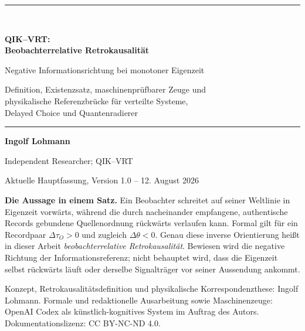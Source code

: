 \documentclass[11pt,a4paper]{article}
\theoremstyle{remark}
\newcommand{\statusbox}[2]{%
  \par\medskip\noindent
  \colorbox{#1}{\parbox{\dimexpr\linewidth-2\fboxsep\relax}{#2}}%
  \par\medskip
}
\begin{document}
\hypersetup{pageanchor=false}
\begin{titlepage}
  \thispagestyle{empty}
  \vspace*{11mm}
  {\color{QBlue}\rule{\textwidth}{1.4pt}}\\[1.1em]
  {\Huge\bfseries QIK--VRT:\\[0.18em]
  Beobachterrelative Retrokausalität\par}
  \vspace{0.7em}
  {\LARGE Negative Informationsrichtung bei monotoner Eigenzeit\par}
  \vspace{0.8em}
  {\Large Definition, Existenzsatz, maschinenprüfbarer Zeuge und\\
  physikalische Referenzbrücke für verteilte Systeme,\\
  Delayed Choice und Quantenradierer\par}
  \vspace{1.1em}
  {\color{QBlue}\rule{\textwidth}{0.6pt}}

  \vfill
  {\large\textbf{Ingolf Lohmann}\par}
  \vspace{0.35em}
  {\normalsize Independent Researcher; QIK--VRT\par}
  \vspace{0.35em}
  {\normalsize Aktuelle Hauptfassung, Version 1.0 -- 12. August 2026\par}

  \vfill
  \statusbox{QGreen}{
    \textbf{Die Aussage in einem Satz.}
    Ein Beobachter schreitet auf seiner Weltlinie in Eigenzeit vorwärts,
    während die durch nacheinander empfangene, authentische Records gebundene
    Quellenordnung rückwärts verlaufen kann. Formal gilt für ein Recordpaar
    \(\Delta\tau_O>0\) und zugleich \(\Delta\theta<0\). Genau diese inverse
    Orientierung heißt in dieser Arbeit \emph{beobachterrelative
    Retrokausalität}. Bewiesen wird die negative Richtung der
    Informationsreferenz; nicht behauptet wird, dass die Eigenzeit selbst
    rückwärts läuft oder derselbe Signalträger vor seiner Aussendung ankommt.
  }

  \vfill
  {\small
    Konzept, Retrokausalitätsdefinition und physikalische Korrespondenzthese:
    Ingolf Lohmann. Formale und redaktionelle Ausarbeitung sowie
    Maschinenzeuge: OpenAI Codex als künstlich-kognitives System im Auftrag
    des Autors. Dokumentationslizenz: CC BY-NC-ND 4.0.
  }
\end{titlepage}
\hypersetup{pageanchor=true}
\setcounter{page}{1}
\end{document}
